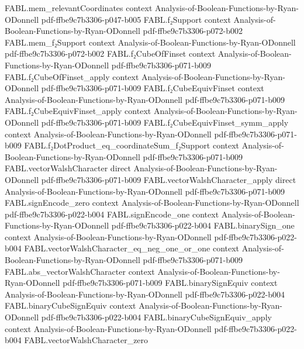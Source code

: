 \begin{theorem}
\proofstep
  {FABL.mem_relevantCoordinates}
  {context}
  {Analysis-of-Boolean-Functions-by-Ryan-ODonnell}
  {pdf-ffbe9c7b3306-p047-b005}
\proofstep
  {FABL.f₂Support}
  {context}
  {Analysis-of-Boolean-Functions-by-Ryan-ODonnell}
  {pdf-ffbe9c7b3306-p072-b002}
\proofstep
  {FABL.mem_f₂Support}
  {context}
  {Analysis-of-Boolean-Functions-by-Ryan-ODonnell}
  {pdf-ffbe9c7b3306-p072-b002}
\proofstep
  {FABL.f₂CubeOfFinset}
  {context}
  {Analysis-of-Boolean-Functions-by-Ryan-ODonnell}
  {pdf-ffbe9c7b3306-p071-b009}
\proofstep
  {FABL.f₂CubeOfFinset_apply}
  {context}
  {Analysis-of-Boolean-Functions-by-Ryan-ODonnell}
  {pdf-ffbe9c7b3306-p071-b009}
\proofstep
  {FABL.f₂CubeEquivFinset}
  {context}
  {Analysis-of-Boolean-Functions-by-Ryan-ODonnell}
  {pdf-ffbe9c7b3306-p071-b009}
\proofstep
  {FABL.f₂CubeEquivFinset_apply}
  {context}
  {Analysis-of-Boolean-Functions-by-Ryan-ODonnell}
  {pdf-ffbe9c7b3306-p071-b009}
\proofstep
  {FABL.f₂CubeEquivFinset_symm_apply}
  {context}
  {Analysis-of-Boolean-Functions-by-Ryan-ODonnell}
  {pdf-ffbe9c7b3306-p071-b009}
\proofstep
  {FABL.f₂DotProduct_eq_coordinateSum_f₂Support}
  {context}
  {Analysis-of-Boolean-Functions-by-Ryan-ODonnell}
  {pdf-ffbe9c7b3306-p071-b009}
\proofstep
  {FABL.vectorWalshCharacter}
  {direct}
  {Analysis-of-Boolean-Functions-by-Ryan-ODonnell}
  {pdf-ffbe9c7b3306-p071-b009}
\proofstep
  {FABL.vectorWalshCharacter_apply}
  {direct}
  {Analysis-of-Boolean-Functions-by-Ryan-ODonnell}
  {pdf-ffbe9c7b3306-p071-b009}
\proofstep
  {FABL.signEncode_zero}
  {context}
  {Analysis-of-Boolean-Functions-by-Ryan-ODonnell}
  {pdf-ffbe9c7b3306-p022-b004}
\proofstep
  {FABL.signEncode_one}
  {context}
  {Analysis-of-Boolean-Functions-by-Ryan-ODonnell}
  {pdf-ffbe9c7b3306-p022-b004}
\proofstep
  {FABL.binarySign_one}
  {context}
  {Analysis-of-Boolean-Functions-by-Ryan-ODonnell}
  {pdf-ffbe9c7b3306-p022-b004}
\proofstep
  {FABL.vectorWalshCharacter_eq_neg_one_or_one}
  {context}
  {Analysis-of-Boolean-Functions-by-Ryan-ODonnell}
  {pdf-ffbe9c7b3306-p071-b009}
\proofstep
  {FABL.abs_vectorWalshCharacter}
  {context}
  {Analysis-of-Boolean-Functions-by-Ryan-ODonnell}
  {pdf-ffbe9c7b3306-p071-b009}
\proofstep
  {FABL.binarySignEquiv}
  {context}
  {Analysis-of-Boolean-Functions-by-Ryan-ODonnell}
  {pdf-ffbe9c7b3306-p022-b004}
\proofstep
  {FABL.binaryCubeSignEquiv}
  {context}
  {Analysis-of-Boolean-Functions-by-Ryan-ODonnell}
  {pdf-ffbe9c7b3306-p022-b004}
\proofstep
  {FABL.binaryCubeSignEquiv_apply}
  {context}
  {Analysis-of-Boolean-Functions-by-Ryan-ODonnell}
  {pdf-ffbe9c7b3306-p022-b004}
\proofstep
  {FABL.vectorWalshCharacter_zero}

\end{theorem}
